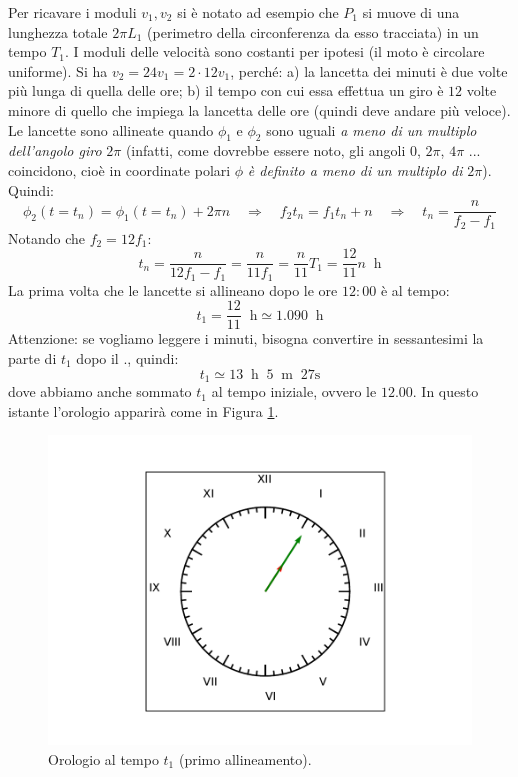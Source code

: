 \documentclass[12pt,a4paper]{book}
\begin{document}
Per ricavare i moduli $v_1, v_2$ si è notato ad esempio che $P_1$ si muove di una 
lunghezza totale $2\pi L_1$ (perimetro della circonferenza da esso tracciata) in un tempo $T_1$. I moduli delle velocità sono costanti per ipotesi (il moto è circolare uniforme). Si ha $v_2 =24  v_1=2\cdot 12 v_1$, perché: a) la lancetta dei minuti è due volte più lunga di quella delle ore; b) il tempo con cui essa effettua un giro è $12$ volte minore di quello che impiega la lancetta delle ore (quindi deve andare più veloce). Le lancette sono allineate quando $\phi_1$ e $\phi_2$ sono uguali \textit{a meno di un multiplo dell'angolo giro} $2\pi$ (infatti, come dovrebbe essere noto, gli angoli $0$, $2\pi$, $4\pi$ ... coincidono, cioè in coordinate polari $\phi$ \textit{è definito a meno di un multiplo di} $2\pi$). Quindi:
\begin{equation*}
\phi_2(t=t_n)=\phi_1(t=t_n)+ 2 \pi n \quad \Rightarrow \quad f_2 t_n=f_1 t_n+  n \quad \Rightarrow \quad t_n=\frac{n}{f_2 - f_1}
\end{equation*}
Notando che $f_2=12 f_1$: 
\begin{equation*}
t_n=\frac{n}{12f_1 - f_1}=\frac{n}{11f_1}=\frac{n}{11} T_1 =\frac{12}{11} n\; \; \text{h}
\end{equation*}
La prima volta che le lancette si allineano dopo le ore $12:00$ è al tempo:
\begin{equation*}
t_1=\frac{12}{11} \; \; \text{h} \simeq 1.090 \; \; \text{h}  
\end{equation*}
Attenzione: se vogliamo leggere i minuti, bisogna convertire in sessantesimi la parte di $t_1$ dopo il $.$, quindi:
\begin{equation*}
t_1\simeq 13 \; \; \text{h}  \; \;  5 \; \; \text{m} \; \; 27 \text{s}
\end{equation*}
dove abbiamo anche sommato $t_1$ al tempo iniziale, ovvero le $12.00$.  In questo istante l'orologio apparirà come in Figura \ref{fig:orologio2}.
 \begin{figure}[!ht]
 \centering
\includegraphics[scale=0.55]{orologio2.pdf}
\caption{Orologio al tempo $t_1$ (primo allineamento).  \label{fig:orologio2} }
\end{figure}
\end{document}
